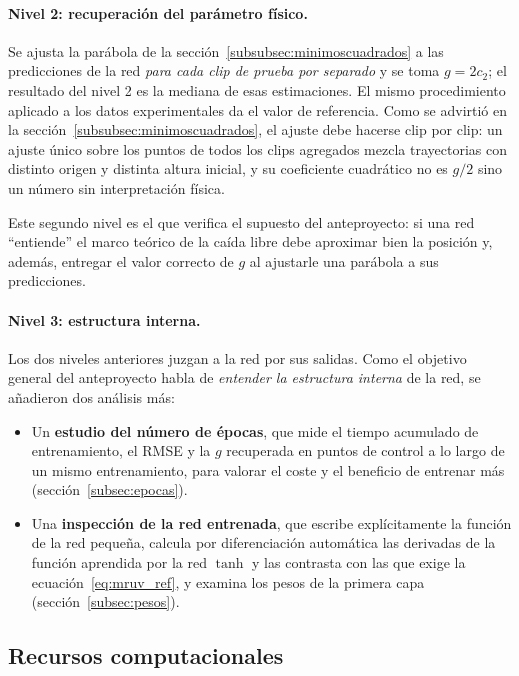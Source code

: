 \documentclass[titlepage,11pt]{article}
\begin{document}
\paragraph{Nivel 2: recuperación del parámetro físico.} Se ajusta la parábola
de la sección~\ref{subsubsec:minimoscuadrados} a las predicciones de la red
\emph{para cada clip de prueba por separado} y se toma $g=2c_2$; el resultado
del nivel 2 es la mediana de esas estimaciones. El mismo procedimiento aplicado
a los datos experimentales da el valor de referencia. Como se advirtió en la
sección~\ref{subsubsec:minimoscuadrados}, el ajuste debe hacerse clip por clip:
un ajuste único sobre los puntos de todos los clips agregados mezcla
trayectorias con distinto origen y distinta altura inicial, y su coeficiente
cuadrático no es $g/2$ sino un número sin interpretación física.

Este segundo nivel es el que verifica el supuesto del anteproyecto: si una red
\enquote{entiende} el marco teórico de la caída libre debe aproximar bien la
posición y, además, entregar el valor correcto de $g$ al ajustarle una parábola
a sus predicciones.

\paragraph{Nivel 3: estructura interna.} Los dos niveles anteriores juzgan a la
red por sus salidas. Como el objetivo general del anteproyecto habla de
\emph{entender la estructura interna} de la red, se añadieron dos análisis más:

\begin{itemize}
\item Un \textbf{estudio del número de épocas}, que mide el tiempo acumulado de
  entrenamiento, el RMSE y la $g$ recuperada en puntos de control a lo largo de
  un mismo entrenamiento, para valorar el coste y el beneficio de entrenar más
  (sección~\ref{subsec:epocas}).
\item Una \textbf{inspección de la red entrenada}, que escribe explícitamente
  la función de la red pequeña, calcula por diferenciación automática las
  derivadas de la función aprendida por la red $\tanh$ y las contrasta con las
  que exige la ecuación~\eqref{eq:mruv_ref}, y examina los pesos de la primera
  capa (sección~\ref{subsec:pesos}).
\end{itemize}

\subsection{Recursos computacionales}
\label{subsec:recursos}
\end{document}
